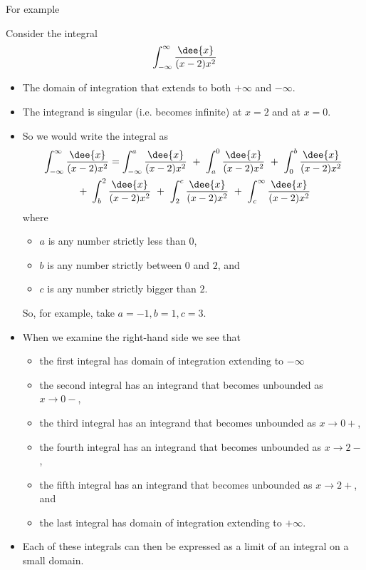 For example
\begin{eg}
Consider the integral
\begin{align*}
  \int_{-\infty}^\infty\frac{\dee{x}}{(x-2)x^2}
\end{align*}
\begin{itemize}
 \item The domain of integration that extends to both $+\infty$ and $-\infty$.
\item The integrand is singular (i.e. becomes infinite) at $x=2$ and at $x=0$.
\item So we would write the integral as
\begin{multline*}
\int_{-\infty}^\infty\frac{\dee{x}}{(x-2)x^2}
=\int_{-\infty}^{a} \frac{\dee{x}}{(x-2)x^2}
 \ +\ \int_{a}^0 \frac{\dee{x}}{(x-2)x^2}
 \ +\ \int_0^b \frac{\dee{x}}{(x-2)x^2}\\
 \ +\ \int_b^2 \frac{\dee{x}}{(x-2)x^2}
 \ +\ \int_2^c \frac{\dee{x}}{(x-2)x^2}
 \ +\ \int_c^\infty \frac{\dee{x}}{(x-2)x^2}
\end{multline*}
where
\begin{itemize}
 \item $a$ is any number strictly less than $0$,
 \item $b$ is any number strictly between $0$ and $2$, and
 \item $c$ is any number strictly bigger than $2$.
\end{itemize}
So, for example, take $a=-1, b=1, c=3$.
\item When we examine the right-hand side we see that
\begin{itemize}
\item the first integral has domain of integration extending to $-\infty$
\item the second integral has an integrand that becomes unbounded as
         $x\rightarrow 0-$,
\item the third integral has an integrand that becomes unbounded as
         $x\rightarrow 0+$,
\item the fourth integral has an integrand that becomes unbounded as
         $x\rightarrow 2-$,
\item the fifth integral has an integrand that becomes unbounded as
         $x\rightarrow 2+$, and
\item the last integral has domain of integration extending to $+\infty$.
\end{itemize}
\item Each of these integrals can then be expressed as a limit of an integral on a small
domain.
\end{itemize}
\end{eg}

